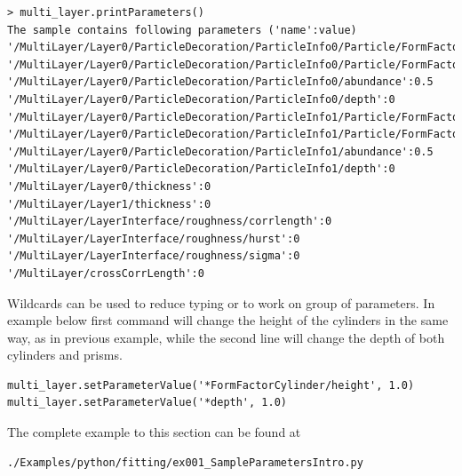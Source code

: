 \begin{lstlisting}[language=shell, style=commandline]
> multi_layer.printParameters()
The sample contains following parameters ('name':value)
'/MultiLayer/Layer0/ParticleDecoration/ParticleInfo0/Particle/FormFactorCylinder/height':5
'/MultiLayer/Layer0/ParticleDecoration/ParticleInfo0/Particle/FormFactorCylinder/radius':5
'/MultiLayer/Layer0/ParticleDecoration/ParticleInfo0/abundance':0.5
'/MultiLayer/Layer0/ParticleDecoration/ParticleInfo0/depth':0
'/MultiLayer/Layer0/ParticleDecoration/ParticleInfo1/Particle/FormFactorPrism3/half_side':5
'/MultiLayer/Layer0/ParticleDecoration/ParticleInfo1/Particle/FormFactorPrism3/height':5
'/MultiLayer/Layer0/ParticleDecoration/ParticleInfo1/abundance':0.5
'/MultiLayer/Layer0/ParticleDecoration/ParticleInfo1/depth':0
'/MultiLayer/Layer0/thickness':0
'/MultiLayer/Layer1/thickness':0
'/MultiLayer/LayerInterface/roughness/corrlength':0
'/MultiLayer/LayerInterface/roughness/hurst':0
'/MultiLayer/LayerInterface/roughness/sigma':0
'/MultiLayer/crossCorrLength':0
\end{lstlisting}

Wildcards  can be used to reduce typing or to work on group of parameters. In example below first command will change the height of the cylinders in the same way, as in previous example, while the second line will change the depth of both cylinders and prisms.
\begin{lstlisting}[language=shell, style=commandline]
multi_layer.setParameterValue('*FormFactorCylinder/height', 1.0)
multi_layer.setParameterValue('*depth', 1.0)
\end{lstlisting}

The complete example to this section can be found at
\begin{lstlisting}[language=shell, style=commandline]
./Examples/python/fitting/ex001_SampleParametersIntro.py
\end{lstlisting}





